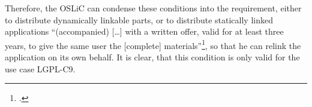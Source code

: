 \begin{itemize}
  Therefore, the OSLiC can condense these conditions into the requirement,
  either to distribute dynamically linkable parts, or to distribute statically
  linked applications \enquote{(accompanied) [\ldots] with a written offer,
  valid for at least three years, to give the same user the [complete]
  materials}\footcite[cf.][\nopage wp.\ §6]{Lgpl21OsiLicense1999a}, so that he
  can relink the application on its own behalf. It is clear, that this condition
  is only valid for the use case LGPL-C9.
  
\end{itemize}





%
